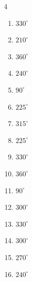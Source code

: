 \begin{multicols}{4}
\begin{enumerate}
  \item $\displaystyle 330^{\circ}$

  \item $\displaystyle 210^{\circ}$

  \item $\displaystyle 360^{\circ}$
        \phantom{$\displaystyle =2\pi$}

  \item $\displaystyle 240^{\circ}$

  \item $\displaystyle 90^{\circ}$

  \item $\displaystyle 225^{\circ}$

  \item $\displaystyle 315^{\circ}$

  \item $\displaystyle 225^{\circ}$

  \item $\displaystyle 330^{\circ}$

  \item $\displaystyle 360^{\circ}$
        \phantom{$\displaystyle =2\pi$}

  \item $\displaystyle 90^{\circ}$

  \item $\displaystyle 300^{\circ}$

  \item $\displaystyle 330^{\circ}$

  \item $\displaystyle 300^{\circ}$

  \item $\displaystyle 270^{\circ}$

  \item $\displaystyle 240^{\circ}$


\end{enumerate}
\end{multicols}
